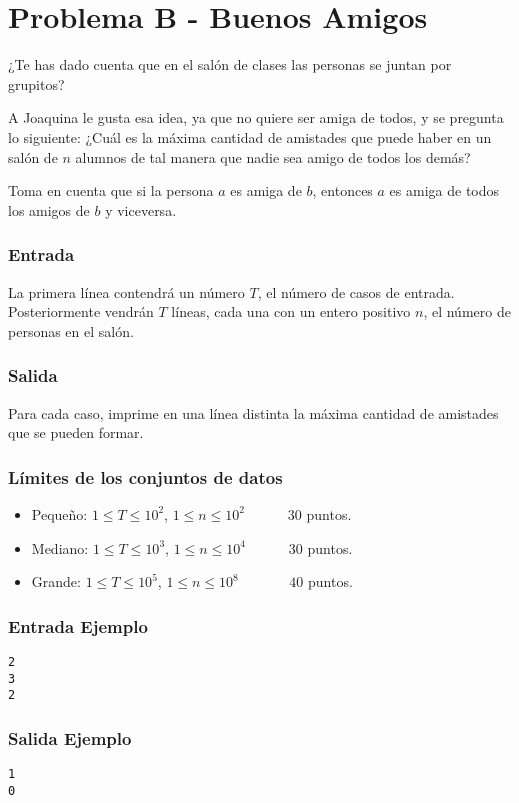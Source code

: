 \chapter*{Problema B - Buenos Amigos}
¿Te has dado cuenta que en el salón de clases las personas se juntan por grupitos?

A Joaquina le gusta esa idea, ya que no quiere ser amiga de todos, y se pregunta lo siguiente: ¿Cuál es la máxima cantidad de amistades que puede haber en un salón de $n$ alumnos de tal manera que nadie sea amigo de todos los demás?

Toma en cuenta que si la persona $a$ es amiga de $b$, entonces $a$ es amiga de todos los amigos de $b$ y viceversa.

\subsection*{Entrada}
La primera línea contendrá un número $T$, el número de 
casos de entrada. Posteriormente vendrán $T$ líneas, cada 
una con un entero positivo $n$, el número de personas en el salón.



\subsection*{Salida}
Para cada caso, imprime en una línea distinta la máxima cantidad de amistades que se pueden formar.

\subsection*{Límites de los conjuntos de datos}

\begin{itemize}
    \item Pequeño: $ 1 \leq T \leq 10^2 $, $ 1 \leq n
    \leq 10^2$   $\quad \;\;\;\;\;$ $30$ puntos.
    \item Mediano: $ 1 \leq T \leq 10^3 $, $ 1 \leq n
    \leq 10^4$   $\quad \;\;\;\;\;$ $30$ puntos.
    \item Grande: $ 1 \leq T \leq 10^5 $, $ 1 \leq n
    \leq 10^8$   $\quad \;\; \;\;\;\;\;$ $40$ puntos.
\end{itemize}



\begin{multicols}{2}

\subsection*{Entrada Ejemplo}

\begin{verbatim}
2
3
2
\end{verbatim}

\columnbreak

\subsection*{Salida Ejemplo}

\begin{verbatim}
1
0
\end{verbatim}

\end{multicols}
